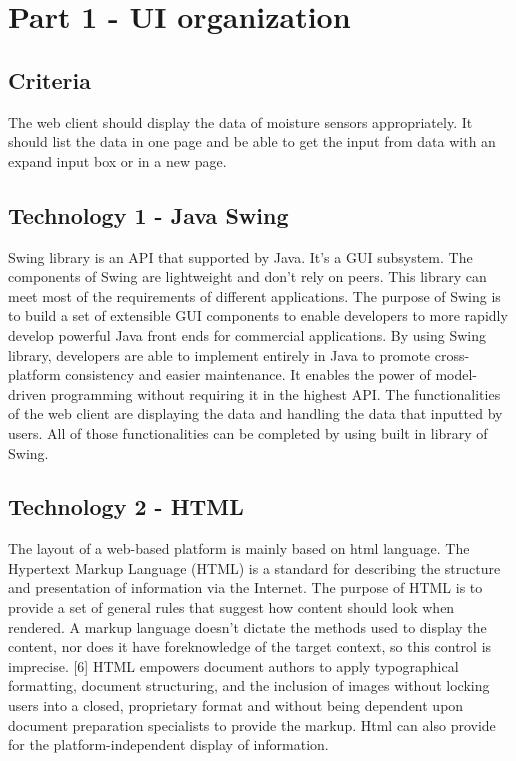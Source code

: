 \documentclass[10pt,onecolumn,journal,draftclsnofoot]{IEEEtran}
\begin{document}
	\section{Part 1 - UI organization}
	\subsection{Criteria}
	\par The web client should display the data of moisture sensors appropriately. It should list the data in one page and be able to get the input from data with an expand input box or in a new page.
	
	\subsection{Technology 1 - Java Swing}
	\par
	Swing library is an API that supported by Java. It’s a GUI subsystem. The components of Swing are lightweight and don’t rely on peers. This library can meet most of the requirements of different applications. The purpose of Swing is to build a set of extensible GUI components to enable developers to more rapidly develop powerful Java front ends for commercial applications. By using Swing library, developers are able to implement entirely in Java to promote cross-platform consistency and easier maintenance. It enables the power of model-driven programming without requiring it in the highest API. The functionalities of the web client are displaying the data and handling the data that inputted by users. All of those functionalities can be completed by using built in library of Swing.  
    \subsection{Technology 2 - HTML}
	\par 
	The layout of a web-based platform is mainly based on html language. The Hypertext Markup Language (HTML) is a standard for describing the structure and presentation of information via the Internet. The purpose of HTML is to provide a set of general rules that suggest how content should look when rendered. A markup language doesn't dictate the methods used to display the content, nor does it have foreknowledge of the target context, so this control is imprecise. [6] HTML empowers document authors to apply typographical formatting, document structuring, and the inclusion of images without locking users into a closed, proprietary format and without being dependent upon document preparation specialists to provide the markup. Html can also provide for the platform-independent display of information. 
\end{document}
